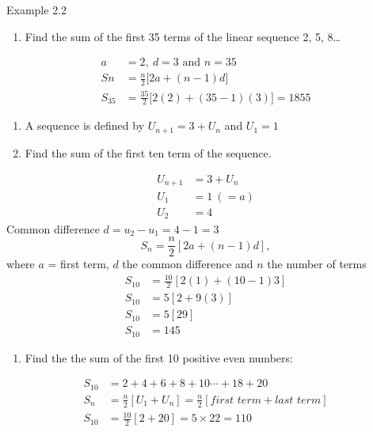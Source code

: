 \begin{example}{Example 2.2}
\begin{enumerate}
  \item[a.] Find the sum of the first 35 terms of the linear sequence 2, 5, 8\ldots
\end{enumerate}

\solution
\begin{align*}
  a &= 2,\ d = 3 \text{ and } n = 35 \\
  Sn &= \frac{n}{2}\big[2a + (n-1)d\big] \\
  S_{35} &= \frac{35}{2}\big[2(2) + (35-1)(3)\big] = 1855
\end{align*}

\begin{enumerate}
  \item[b.] A sequence is defined by $U_{n+1} = 3 + U_n$ and $U_1 = 1$
  \item[c.] Find the sum of the first ten term of the sequence.
\end{enumerate}

\solution
\begin{align*}
  U_{n+1} &= 3 + U_n \\
  U_1 &= 1\ (= a) \\
  U_2 &= 4
\end{align*}
Common difference $d = u_2 - u_1 = 4 - 1 = 3$
\[
  S_n = \frac{n}{2}[2a + (n-1)d],
\]
where $a$ = first term, $d$ the common difference and $n$ the number of terms
\begin{align*}
  S_{10} &= \frac{10}{2}[2(1) + (10-1)3] \\
  S_{10} &= 5[2 + 9(3)] \\
  S_{10} &= 5[29] \\
  S_{10} &= 145
\end{align*}

\begin{enumerate}
  \item[d.] Find the the sum of the first 10 positive even numbers:
\end{enumerate}

\solution
\begin{align*}
  S_{10} &= 2 + 4 + 6 + 8 + 10 \cdots + 18 + 20 \\
  S_n &= \frac{n}{2}[U_1 + U_n] = \frac{n}{2}[\textit{first term} + \textit{last term}] \\
  S_{10} &= \frac{10}{2}[2 + 20] = 5 \times 22 = 110
\end{align*}
\end{example}

